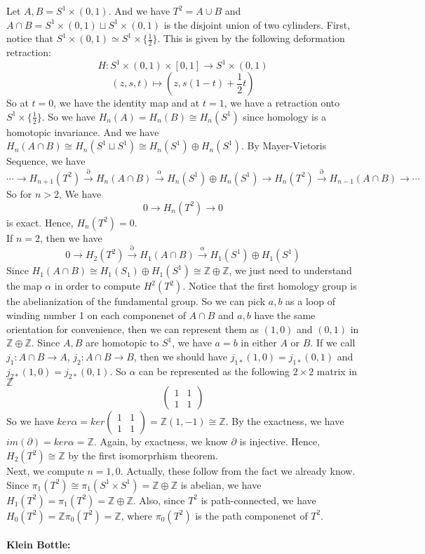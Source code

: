 \documentclass[12pt]{amsart}
\newcommand{\Z}{\mathbb{Z}}
\begin{document}
Let $A,B=S^1\times (0,1)$. And we have $T^2=A\cup B$ and $A\cap B=S^1\times (0,1)\sqcup S^1\times (0,1)$ is the disjoint union of two cylinders.
First, notice that $S^1\times (0,1)\simeq S^1\times \{\frac{1}{2}\}$. This is given by the following deformation retraction: 
\[H:S^1\times (0,1)\times [0,1]\to S^1\times (0,1)\]
\[(z,s,t)\mapsto (z,s(1-t)+\frac{1}{2}t)\]
So at $t=0$, we have the identity map and at $t=1$, we have a retraction onto $S^1\times \{\frac{1}{2}\}$.
So we have $H_n(A)=H_n(B)\cong H_n(S^1)$ since homology is a homotopic invariance. And we have $H_n(A\cap B)\cong H_n(S^1\sqcup S^1)\cong H_n(S^1)\oplus H_n(S^1)$. By Mayer-Vietoris Sequence, we have 
\[\cdots \xrightarrow[]{}H_{n+1}(T^2) \xrightarrow[]{\partial}H_n(A\cap B)\xrightarrow[]{\alpha}H_n(S^1)\oplus H_n(S^1)\xrightarrow[]{}H_n(T^2)\xrightarrow[]{\partial}H_{n-1}(A\cap B)\to \cdots\]
So for $n>2$, We have
\[0\to H_n(T^2)\to 0\]
is exact. Hence, $H_n(T^2)=0$.\\
If $n=2$, then we have
\[0\to H_2(T^2)\xrightarrow[]{\partial} H_1(A\cap B)\xrightarrow[]{\alpha}H_1(S^1)\oplus H_1(S^1)\]
Since $H_1(A\cap B)\cong H_1(S_1)\oplus H_1(S^1)\cong \Z\oplus\Z$, we just need to understand the map $\alpha$ in order to compute $H^2(T^2)$. Notice that the first homology group is the abelianization of the fundamental group. So we can pick $a,b$ as a loop of winding number 1 on each componenet of $A\cap B$ and $a,b$ have the same orientation for convenience, then we can represent them as $(1,0)$ and $(0,1)$ in $\Z\oplus \Z$. Since $A,B$ are homotopic to $S^1$, we have $a=b$ in either $A$ or $B$. If we call $j_1:A\cap B\to A$, $j_2:A\cap B\to B$, then we should have $j_{1\ast}(1,0)=j_{1\ast}(0,1)$ and $j_{2\ast}(1,0)=j_{2\ast}(0,1)$. So $\alpha$ can be represented as the following $2\times 2$ matrix in $\Z$
\[\begin{pmatrix}
    1&1\\
    1&1
\end{pmatrix}\]
So we have $ker\alpha=ker\begin{pmatrix}
    1&1\\
    1&1
\end{pmatrix}=\Z(1,-1)\cong \Z$. By the exactness, we have $im(\partial)=ker\alpha=\Z$. Again, by exactness, we know $\partial$ is injective. Hence, $H_2(T^2)\cong \Z$ by the first isomorprhism theorem.\\
Next, we compute $n=1,0$. Actually, these follow from the fact we already know. Since $\pi_1(T^2)\cong\pi_1(S^1\times S^1)=\Z\oplus \Z$ is abelian, we have $H_1(T^2)=\pi_1(T^2)=\Z\oplus \Z$. Also, since $T^2$ is path-connected, we have $H_0(T^2)=\Z\pi_0(T^2)=\Z$, where $\pi_0(T^2)$ is the path componenet of $T^2$.\\
\smallskip\\
\textbf{Klein Bottle:} 
\hfill\\
\hfill\\
\hfill\\
\hfill\\
\hfill\\
\hfill\\
\hfill\\
\hfill\\
\hfill\\
\end{document}
